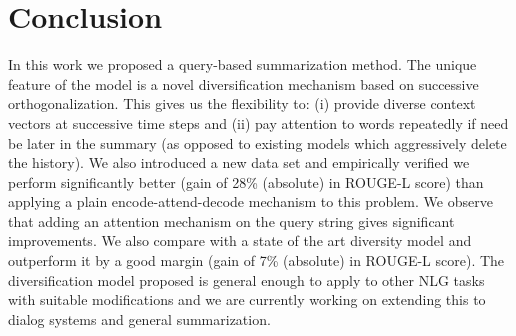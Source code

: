 \documentclass[11pt]{article}
\begin{document}
\section{Conclusion}
In this work we proposed a query-based summarization method. The unique feature of the model is
a novel diversification mechanism based on successive orthogonalization. This gives us the flexibility to: (i) provide diverse context vectors at successive time steps and (ii) pay attention to words repeatedly if need be later in the summary (as opposed to existing models which aggressively delete the history). We also introduced a new data set and empirically verified we perform significantly better (gain of 28\% (absolute) in ROUGE-L score) than applying a plain encode-attend-decode mechanism to this problem. We observe that adding an attention mechanism on the query string gives significant improvements. We also compare with a state of the art diversity  model and outperform it by a good margin (gain of 7\% (absolute) in ROUGE-L score). The diversification model proposed is general enough to apply to other NLG tasks with suitable modifications and we are currently working on extending this to dialog systems and general summarization. 





\end{document}
